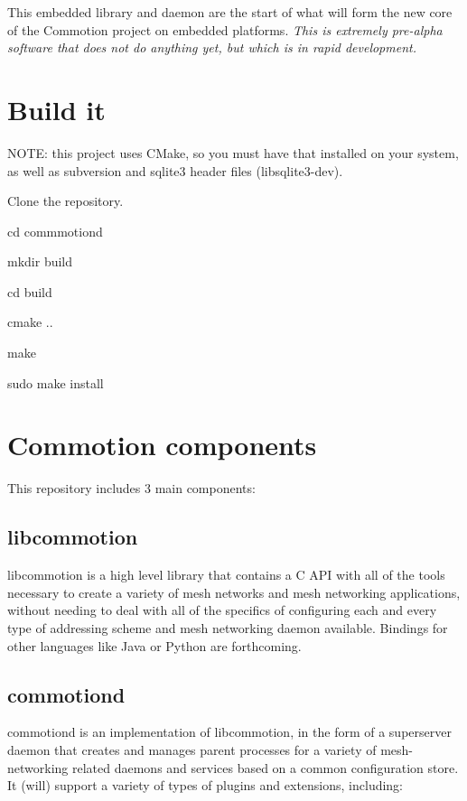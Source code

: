 This embedded library and daemon are the start of what will form the new core of the Commotion project on embedded platforms. {\itshape This is extremely pre-\/alpha software that does not do anything yet, but which is in rapid development.}

\section*{Build it }

N\-O\-T\-E\-: this project uses C\-Make, so you must have that installed on your system, as well as subversion and sqlite3 header files (libsqlite3-\/dev).


\begin{DoxyEnumerate}
\item Clone the repository.
\item cd commmotiond
\item mkdir build
\item cd build
\item cmake ..
\item make
\item sudo make install
\end{DoxyEnumerate}

\section*{Commotion components }

This repository includes 3 main components\-:

\subsection*{libcommotion }

libcommotion is a high level library that contains a C A\-P\-I with all of the tools necessary to create a variety of mesh networks and mesh networking applications, without needing to deal with all of the specifics of configuring each and every type of addressing scheme and mesh networking daemon available. Bindings for other languages like Java or Python are forthcoming.

\subsection*{commotiond }

commotiond is an implementation of libcommotion, in the form of a superserver daemon that creates and manages parent processes for a variety of mesh-\/networking related daemons and services based on a common configuration store. It (will) support a variety of types of plugins and extensions, including\-:


